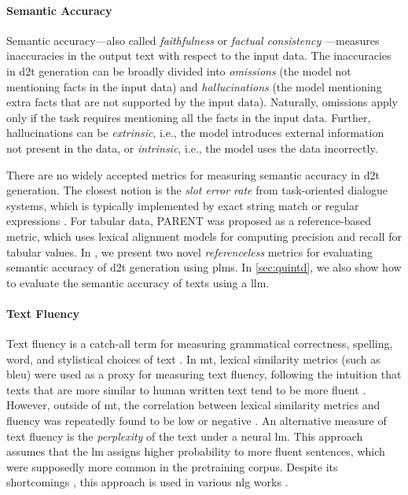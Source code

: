 {\paragraph{Semantic Accuracy} Semantic accuracy---also called \emph{faithfulness} or \emph{factual consistency} \cite{celikyilmazEvaluationTextGeneration2021}---measures inaccuracies in the output text with respect to the input data. The inaccuracies in \ac{d2t} generation can be broadly divided into \emph{omissions} (the model not mentioning facts in the input data) and \emph{hallucinations} (the model mentioning extra facts that are not supported by the input data). Naturally, omissions apply only if the task requires mentioning all the facts in the input data. Further, hallucinations can be \emph{extrinsic}, i.e., the model introduces external information not present in the data, or \emph{intrinsic}, i.e., the model uses the data incorrectly. \cite{maynezFaithfulnessFactualityAbstractive2020}

There are no widely accepted metrics for measuring semantic accuracy in \ac{d2t} generation. The closest notion is the \emph{slot error rate} from task-oriented dialogue systems, which is typically implemented by exact string match or regular expressions  \cite{wen2015semantically,dusekEvaluatingStateoftheartEndtoEnd2020}. For tabular data, PARENT \cite{dhingraHandlingDivergentReference2019} was proposed as a reference-based metric, which uses lexical alignment models for computing precision and recall for tabular values.  In , we present two novel \emph{referenceless} metrics for evaluating semantic accuracy of \ac{d2t} generation using \acp{plm}. In \autoref{sec:quintd}, we also show how to evaluate the semantic accuracy of texts using a \ac{llm}.

\paragraph{Text Fluency} Text fluency is a catch-all term for measuring grammatical correctness, spelling, word, and stylistical choices of text \cite{celikyilmazEvaluationTextGeneration2021}. In \ac{mt}, lexical similarity metrics (such as \acs{bleu}) were used as a proxy for measuring text fluency, following the intuition that texts that are more similar to human written text tend to be more fluent \cite{papineni2002bleu,celikyilmazEvaluationTextGeneration2021}. However, outside of \ac{mt}, the correlation between lexical similarity metrics and fluency was repeatedly found to be low or negative \cite{novikovaWhyWeNeed2017,fabbri2021summeval,nekvinda2021shades}. An alternative measure of text fluency is the \emph{perplexity} of the text under a neural \ac{lm}. This approach assumes that the \ac{lm} assigns higher probability to more fluent sentences, which were supposedly more common in the pretraining corpus. Despite its shortcomings \cite{wang2022perplexity}, this approach is used in various \ac{nlg} works \cite{kann2018sentence,wang2020cat,kaneNUBIANeUralBased2020,liu2021can,leeFactualityEnhancedLanguage2022}.


}
